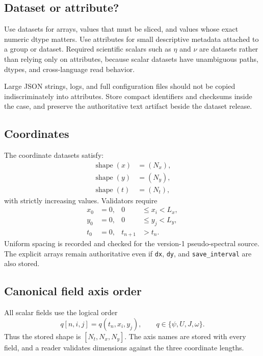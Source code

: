 \documentclass[11pt]{article}
\newcommand{\code}[1]{\texttt{#1}}
\begin{document}
\subsection{Dataset or attribute?}

Use datasets for arrays, values that must be sliced, and values whose exact numeric dtype matters. Use attributes for small descriptive metadata attached to a group or dataset. Required scientific scalars such as $\eta$ and $\nu$ are datasets rather than relying only on attributes, because scalar datasets have unambiguous paths, dtypes, and cross-language read behavior.

Large JSON strings, logs, and full configuration files should not be copied indiscriminately into attributes. Store compact identifiers and checksums inside the case, and preserve the authoritative text artifact beside the dataset release.

\subsection{Coordinates}

The coordinate datasets satisfy:
\begin{align}
\operatorname{shape}(x)&=(N_x),\\
\operatorname{shape}(y)&=(N_y),\\
\operatorname{shape}(t)&=(N_t),
\end{align}
with strictly increasing values. Validators require
\begin{align}
x_0&=0,& 0&\le x_i<L_x,\\
y_0&=0,& 0&\le y_j<L_y,\\
t_0&=0,& t_{n+1}&>t_n.
\end{align}
Uniform spacing is recorded and checked for the version-1 pseudo-spectral source. The explicit arrays remain authoritative even if \code{dx}, \code{dy}, and \code{save\_interval} are also stored.

\subsection{Canonical field axis order}

All scalar fields use the logical order
\begin{equation}
q[n,i,j]=q(t_n,x_i,y_j),
\qquad q\in\{\psi,U,J,\omega\}.
\label{eq:axis_order}
\end{equation}
Thus the stored shape is $[N_t,N_x,N_y]$. The axis names are stored with every field, and a reader validates dimensions against the three coordinate lengths.
\end{document}
